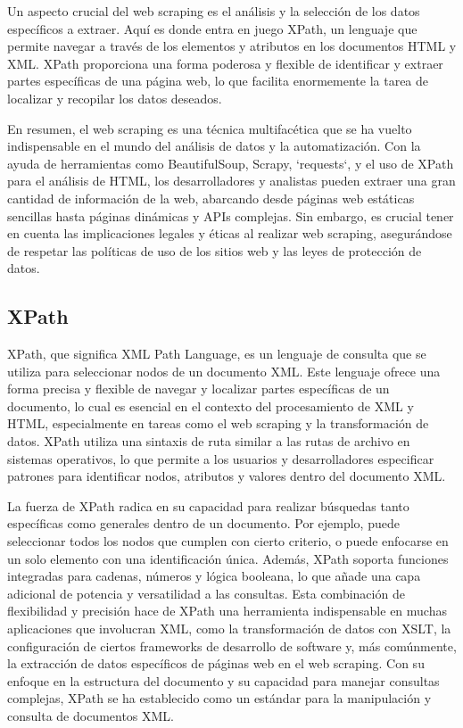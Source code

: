     Un aspecto crucial del web scraping es el análisis y la selección de los datos específicos a extraer. Aquí es donde entra en juego XPath, un lenguaje que permite navegar a través de los elementos y atributos en los documentos HTML y XML. XPath proporciona una forma poderosa y flexible de identificar y extraer partes específicas de una página web, lo que facilita enormemente la tarea de localizar y recopilar los datos deseados.

    En resumen, el web scraping es una técnica multifacética que se ha vuelto indispensable en el mundo del análisis de datos y la automatización. Con la ayuda de herramientas como BeautifulSoup, Scrapy, `requests`, y el uso de XPath para el análisis de HTML, los desarrolladores y analistas pueden extraer una gran cantidad de información de la web, abarcando desde páginas web estáticas sencillas hasta páginas dinámicas y APIs complejas. Sin embargo, es crucial tener en cuenta las implicaciones legales y éticas al realizar web scraping, asegurándose de respetar las políticas de uso de los sitios web y las leyes de protección de datos.
    
        \subsection{XPath}

        XPath, que significa XML Path Language, es un lenguaje de consulta que se utiliza para seleccionar nodos de un documento XML. Este lenguaje ofrece una forma precisa y flexible de navegar y localizar partes específicas de un documento, lo cual es esencial en el contexto del procesamiento de XML y HTML, especialmente en tareas como el web scraping y la transformación de datos. XPath utiliza una sintaxis de ruta similar a las rutas de archivo en sistemas operativos, lo que permite a los usuarios y desarrolladores especificar patrones para identificar nodos, atributos y valores dentro del documento XML.

        La fuerza de XPath radica en su capacidad para realizar búsquedas tanto específicas como generales dentro de un documento. Por ejemplo, puede seleccionar todos los nodos que cumplen con cierto criterio, o puede enfocarse en un solo elemento con una identificación única. Además, XPath soporta funciones integradas para cadenas, números y lógica booleana, lo que añade una capa adicional de potencia y versatilidad a las consultas. Esta combinación de flexibilidad y precisión hace de XPath una herramienta indispensable en muchas aplicaciones que involucran XML, como la transformación de datos con XSLT, la configuración de ciertos frameworks de desarrollo de software y, más comúnmente, la extracción de datos específicos de páginas web en el web scraping. Con su enfoque en la estructura del documento y su capacidad para manejar consultas complejas, XPath se ha establecido como un estándar para la manipulación y consulta de documentos XML.

